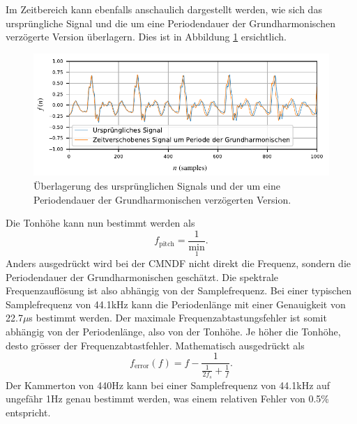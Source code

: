 Im Zeitbereich kann ebenfalls anschaulich dargestellt werden, wie sich das ursprüngliche Signal und die um eine Periodendauer der Grundharmonischen verzögerte Version überlagern.
Dies ist in Abbildung \ref{autotune:fig:audioShifted} ersichtlich.
\begin{figure}
	\centering
	\includegraphics[width=\textwidth]{papers/autotune/images/Example-Audio-Shifted.pdf}
	\caption{Überlagerung des ursprünglichen Signals und der um eine Periodendauer der Grundharmonischen verzögerten Version.}
    \label{autotune:fig:audioShifted}
\end{figure}

Die Tonhöhe kann nun bestimmt werden als
\begin{equation}
    f_{\text{pitch}}
    =
    \frac{1}{\operatorname{min}_1}.
\end{equation}
Anders ausgedrückt wird bei der CMNDF nicht direkt die Frequenz, sondern die Periodendauer der Grundharmonischen geschätzt.
Die spektrale Frequenzauflösung ist also abhängig von der Samplefrequenz.
Bei einer typischen Samplefrequenz von 44.1\;kHz kann die Periodenlänge mit einer Genauigkeit von 22.7\;$\mu$s bestimmt werden.
Der maximale Frequenzabtastungsfehler ist somit abhängig von der Periodenlänge, also von der Tonhöhe.
Je höher die Tonhöhe, desto grösser der Frequenzabtastfehler.
Mathematisch ausgedrückt als
\begin{equation}
    f_{\text{error}}(f)
    =
    f - \frac{1}{\frac{1}{2 f_s} + \frac{1}{f}}.
\end{equation}
Der Kammerton von 440\;Hz kann bei einer Samplefrequenz von 44.1\;kHz auf ungefähr 1\;Hz genau bestimmt werden, 
was einem relativen Fehler von 0.5\% entspricht.

